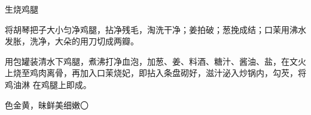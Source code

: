 \begin{recipe}{生烧鸡腿}

\ingredients


\preparation

\step 将胡琴把子大小匀净鸡腿，拈净残毛，淘洗干净；姜拍破；葱挽成结；口茉用沸水
发胀，洗净，大朵的用刀切成两瓣。

\step 用包罐装清水下鸡腿，煮沸打净血泡，加葱、姜、料酒、糖汁、酱油、盐，在文火
上烧至鸡肉离骨，再加入口茉烧妃，即拈入条盘砌好，滋汁泌入炒锅内，勾芡，将鸡油淋
在鸡腿上即成。

\features

色金黄，昧鲜美细嫩〇

\end{recipe}

